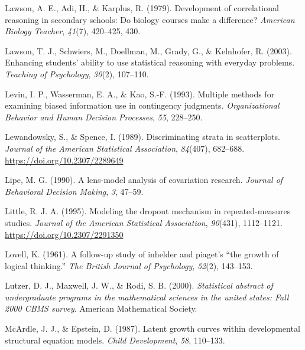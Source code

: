 \documentclass[11pt]{umnthesis}
\newlength{\cslhangindent}
\newenvironment{CSLReferences}[2] %
 {%
  \setlength{\parindent}{0pt}
  \ifodd #1 \everypar{\setlength{\hangindent}{\cslhangindent}}\ignorespaces\fi
  \ifnum #2 > 0
  \setlength{\parskip}{#2\baselineskip}
  \fi
 }%
 {}
\begin{document}
\begin{CSLReferences}{1}{0}
\leavevmode{}%
Lawson, A. E., Adi, H., \& Karplus, R. (1979). Development of correlational reasoning in secondary schools: Do biology courses make a difference? \emph{American Biology Teacher}, \emph{41}(7), 420--425, 430.

\leavevmode{}%
Lawson, T. J., Schwiers, M., Doellman, M., Grady, G., \& Kelnhofer, R. (2003). Enhancing students' ability to use statistical reasoning with everyday problems. \emph{Teaching of Psychology}, \emph{30}(2), 107--110.

\leavevmode{}%
Levin, I. P., Wasserman, E. A., \& Kao, S.-F. (1993). Multiple methods for examining biased information use in contingency judgments. \emph{Organizational Behavior and Human Decision Processes}, \emph{55}, 228--250.

\leavevmode{}%
Lewandowsky, S., \& Spence, I. (1989). Discriminating strata in scatterplots. \emph{Journal of the American Statistical Association}, \emph{84}(407), 682--688. \url{https://doi.org/10.2307/2289649}

\leavevmode{}%
Lipe, M. G. (1990). A lens-model analysis of covariation research. \emph{Journal of Behavioral Decision Making}, \emph{3}, 47--59.

\leavevmode{}%
Little, R. J. A. (1995). Modeling the dropout mechanism in repeated-measures studies. \emph{Journal of the American Statistical Association}, \emph{90}(431), 1112--1121. \url{https://doi.org/10.2307/2291350}

\leavevmode{}%
Lovell, K. (1961). A follow-up study of inhelder and piaget's {``the growth of logical thinking.''} \emph{The British Journal of Psychology}, \emph{52}(2), 143--153.

\leavevmode{}%
Lutzer, D. J., Maxwell, J. W., \& Rodi, S. B. (2000). \emph{Statistical abstract of undergraduate programs in the mathematical sciences in the united states: Fall 2000 {CBMS} survey}. American Mathematical Society.

\leavevmode{}%
McArdle, J. J., \& Epstein, D. (1987). Latent growth curves within developmental structural equation models. \emph{Child Development}, \emph{58}, 110--133.


\end{CSLReferences}
\end{document}
